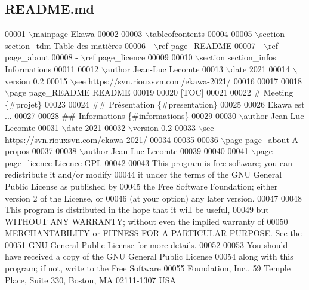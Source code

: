 \hypertarget{_r_e_a_d_m_e_8md_source}{}\subsection{R\+E\+A\+D\+M\+E.\+md}

\begin{DoxyCode}
00001 \(\backslash\)mainpage Ekawa
00002 
00003 \(\backslash\)tableofcontents
00004 
00005 \(\backslash\)section section\_tdm Table des matières
00006 - \(\backslash\)ref page\_README
00007 - \(\backslash\)ref page\_about
00008 - \(\backslash\)ref page\_licence
00009 
00010 \(\backslash\)section section\_infos Informations
00011 
00012 \(\backslash\)author Jean-Luc Lecomte
00013 \(\backslash\)date 2021
00014 \(\backslash\)version 0.2
00015 \(\backslash\)see https://svn.riouxsvn.com/ekawa-2021/
00016 
00017 
00018 \(\backslash\)page page\_README README
00019 
00020 [TOC]
00021 
00022 # Meeting \{#projet\}
00023 
00024 ## Présentation \{#presentation\}
00025 
00026 Ekawa est ...
00027 
00028 ## Informations \{#informations\}
00029 
00030 \(\backslash\)author Jean-Luc Lecomte
00031 \(\backslash\)date 2021
00032 \(\backslash\)version 0.2
00033 \(\backslash\)see https://svn.riouxsvn.com/ekawa-2021/
00034 
00035 
00036 \(\backslash\)page page\_about A propos
00037 
00038 \(\backslash\)author Jean-Luc Lecomte
00039 
00040 
00041 \(\backslash\)page page\_licence Licence GPL
00042 
00043 This program is free software; you can redistribute it and/or modify
00044 it under the terms of the GNU General Public License as published by
00045 the Free Software Foundation; either version 2 of the License, or
00046 (at your option) any later version.
00047 
00048 This program is distributed in the hope that it will be useful,
00049 but WITHOUT ANY WARRANTY; without even the implied warranty of
00050 MERCHANTABILITY or FITNESS FOR A PARTICULAR PURPOSE. See the
00051 GNU General Public License for more details.
00052 
00053 You should have received a copy of the GNU General Public License
00054 along with this program; if not, write to the Free Software
00055 Foundation, Inc., 59 Temple Place, Suite 330, Boston, MA 02111-1307 USA
\end{DoxyCode}
